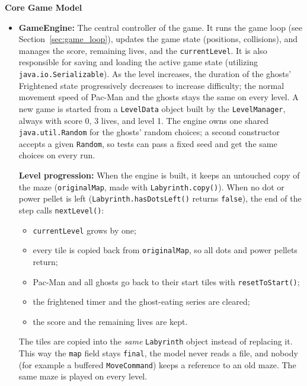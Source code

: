 \documentclass[11pt, a4paper]{article}
\begin{document}
\textbf{Core Game Model}
\begin{itemize}
    \item \textbf{GameEngine:} The central controller of the game. It runs the game loop (see Section~\ref{sec:game_loop}), updates the game state (positions, collisions), and manages the score, remaining lives, and the \texttt{currentLevel}. It is also responsible for saving and loading the active game state (utilizing \texttt{java.io.Serializable}). As the level increases, the duration of the ghosts' Frightened state progressively decreases to increase difficulty; the normal movement speed of Pac-Man and the ghosts stays the same on every level. A new game is started from a \texttt{LevelData} object built by the \texttt{LevelManager}, always with score 0, 3 lives, and level 1. The engine owns one shared \texttt{java.util.Random} for the ghosts' random choices; a second constructor accepts a given \texttt{Random}, so tests can pass a fixed seed and get the same choices on every run.

    \textbf{Level progression:} When the engine is built, it keeps an untouched copy of the maze (\texttt{originalMap}, made with \texttt{Labyrinth.copy()}). When no dot or power pellet is left (\texttt{Labyrinth.hasDotsLeft()} returns \texttt{false}), the end of the step calls \texttt{nextLevel()}:
    \begin{itemize}
        \item \texttt{currentLevel} grows by one;
        \item every tile is copied back from \texttt{originalMap}, so all dots and power pellets return;
        \item Pac-Man and all ghosts go back to their start tiles with \texttt{resetToStart()};
        \item the frightened timer and the ghost-eating series are cleared;
        \item the score and the remaining lives are kept.
    \end{itemize}
    The tiles are copied into the \textit{same} \texttt{Labyrinth} object instead of replacing it. This way the \texttt{map} field stays \texttt{final}, the model never reads a file, and nobody (for example a buffered \texttt{MoveCommand}) keeps a reference to an old maze. The same maze is played on every level.


\end{itemize}
\end{document}
